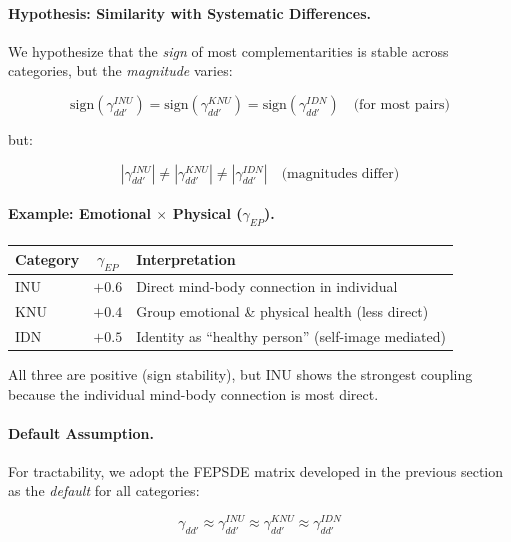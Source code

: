 \paragraph{Hypothesis: Similarity with Systematic Differences.}
We hypothesize that the \emph{sign} of most complementarities is stable 
across categories, but the \emph{magnitude} varies:

\begin{equation}
\text{sign}(\gamma^{INU}_{dd'}) = \text{sign}(\gamma^{KNU}_{dd'}) = \text{sign}(\gamma^{IDN}_{dd'})
\quad \text{(for most pairs)}
\end{equation}

but:

\begin{equation}
|\gamma^{INU}_{dd'}| \neq |\gamma^{KNU}_{dd'}| \neq |\gamma^{IDN}_{dd'}|
\quad \text{(magnitudes differ)}
\end{equation}

\paragraph{Example: Emotional $\times$ Physical ($\gamma_{EP}$).}

\begin{center}
\renewcommand{\arraystretch}{1.3}
\begin{tabular}{|l|c|l|}
\hline
\textbf{Category} & \textbf{$\gamma_{EP}$} & \textbf{Interpretation} \\
\hline
INU & $+0.6$ & Direct mind-body connection in individual \\
KNU & $+0.4$ & Group emotional \& physical health (less direct) \\
IDN & $+0.5$ & Identity as ``healthy person'' (self-image mediated) \\
\hline
\end{tabular}
\end{center}

All three are positive (sign stability), but INU shows the strongest 
coupling because the individual mind-body connection is most direct.

\paragraph{Default Assumption.}
For tractability, we adopt the FEPSDE matrix developed in the previous 
section as the \emph{default} for all categories:

\begin{equation}
\gamma_{dd'} \approx \gamma^{INU}_{dd'} \approx \gamma^{KNU}_{dd'} \approx \gamma^{IDN}_{dd'}
\end{equation}

